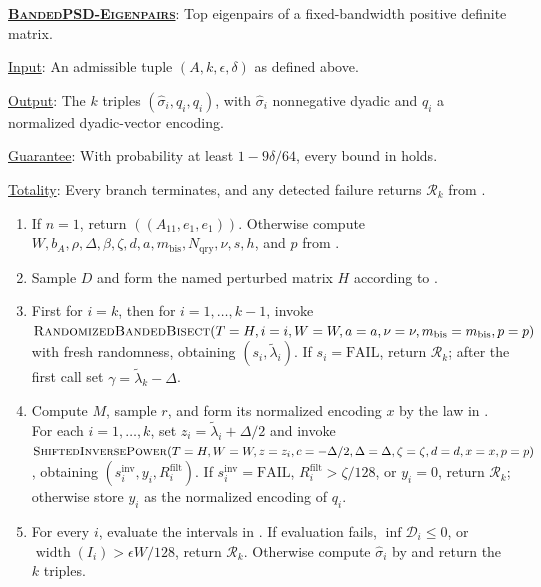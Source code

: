 \documentclass[11pt]{article}
\newenvironment{fminipage}%
  {\begin{Sbox}\begin{minipage}}%
  {\end{minipage}\end{Sbox}\fbox{\TheSbox}}
\newenvironment{algbox}[0]{%
\vskip 0.2in
\noindent
\begin{fminipage}{6.3in}
}{%
\end{fminipage}
\vskip 0.2in
}
\newcommand{\BandedPSDEigenpairs}{%
  \textnormal{\textsc{BandedPSD-\hspace{0pt}Eigenpairs}}}
\newcommand{\RandomizedBandedBisect}{%
  \textnormal{\textsc{Randomized\hspace{0pt}Banded\hspace{0pt}Bisect}}}
\newcommand{\ShiftedInversePower}{%
  \textnormal{\textsc{Shifted\hspace{0pt}Inverse\hspace{0pt}Power}}}
\begin{document}
\begin{algbox}
\textbf{\uline{\BandedPSDEigenpairs}}: Top eigenpairs of a
fixed-bandwidth positive definite matrix.
\label{alg:main}

\uline{Input}: An admissible tuple $(A,k,\epsilon,\delta)$ as defined above.

\uline{Output}: The $k$ triples $(\widehat\sigma_i,q_i,q_i)$, with
$\widehat\sigma_i$ nonnegative dyadic and $q_i$ a normalized dyadic-vector
encoding.

\uline{Guarantee}: With probability at least $1-9\delta/64$, every bound in
 holds.

\uline{Totality}: Every branch terminates, and any detected failure returns
$\mathcal R_k$ from .

\begin{enumerate}
 \item If $n=1$, return $((A_{11},e_1,e_1))$.  Otherwise compute
 $W,b_A,\rho,\Delta,\beta,\zeta,d,a,m_{\mathrm{bis}},N_{\mathrm{qry}},
 \nu,s,h$, and $p$ from
 .
 \item Sample $D$ and form the named perturbed matrix $H$ according to
 .
 \item First for $i=k$, then for $i=1,\ldots,k-1$, invoke
 $\RandomizedBandedBisect(T=H,i=i,W=W,a=a,\nu=\nu,
 m_{\mathrm{bis}}=m_{\mathrm{bis}},p=p)$ with fresh randomness, obtaining
 $(s_i,\widetilde\lambda_i)$.  If $s_i=\mathrm{FAIL}$, return
 $\mathcal R_k$; after the first call set $\gamma=\widetilde\lambda_k-\Delta$.
 \item Compute $M$, sample $r$, and form its normalized encoding $x$ by the
 law in .  For each $i=1,\ldots,k$, set
 $z_i=\widetilde\lambda_i+\Delta/2$ and invoke
 $\ShiftedInversePower(T=H,W=W,z=z_i,c=-\Delta/2,\Delta=\Delta,
 \zeta=\zeta,d=d,x=x,p=p)$,
 obtaining $(s_i^{\mathrm{inv}},y_i,R_i^{\mathrm{filt}})$.  If
 $s_i^{\mathrm{inv}}=\mathrm{FAIL}$,
 $R_i^{\mathrm{filt}}>\zeta/128$, or $y_i=0$, return $\mathcal R_k$;
 otherwise store $y_i$ as the normalized encoding of $q_i$.
 \item For every $i$, evaluate the intervals in
 .  If evaluation fails,
 $\inf\mathcal D_i\leq0$, or
 $\operatorname{width}(I_i)>\epsilon W/128$, return $\mathcal R_k$.
 Otherwise compute $\widehat\sigma_i$ by  and
 return the $k$ triples.
\end{enumerate}
\end{algbox}
\end{document}
